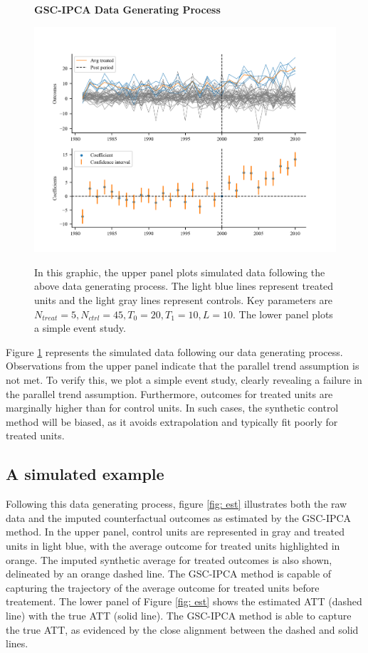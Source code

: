 \documentclass[12pt]{article}
\begin{document}
\begin{figure}[!ht]
    \centering
    \caption{\textbf{GSC-IPCA Data Generating Process}}
    \includegraphics{figs/data_plot.png}
    \label{fig: sim}
    \caption*{\footnotesize{In this graphic, the upper panel plots simulated data following the above data generating process. The light blue lines represent treated units and the light gray lines represent controls. Key parameters are$N_{treat} = 5, N_{ctrl} = 45, T_0=20, T_1=10, L=10$. The lower panel plots a simple event study.}}
    \end{figure}

Figure \ref{fig: sim} represents the simulated data following our data generating process. Observations from the upper panel indicate that the parallel trend assumption is not met. To verify this, we plot a simple event study, clearly revealing a failure in the parallel trend assumption. Furthermore, outcomes for treated units are marginally higher than for control units. In such cases, the synthetic control method will be biased, as it avoids extrapolation and typically fit poorly for treated units.

\subsection{A simulated example}
Following this data generating process, figure \ref{fig: est} illustrates both the raw data and the imputed counterfactual outcomes as estimated by the GSC-IPCA method. In the upper panel, control units are represented in gray and treated units in light blue, with the average outcome for treated units highlighted in orange. The imputed synthetic average for treated outcomes is also shown, delineated by an orange dashed line. The GSC-IPCA method is capable of capturing the trajectory of the average outcome for treated units before treatement. The lower panel of Figure \ref{fig: est} shows the estimated ATT (dashed line) with the true ATT (solid line). The GSC-IPCA method is able to capture the true ATT, as evidenced by the close alignment between the dashed and solid lines.
\end{document}

